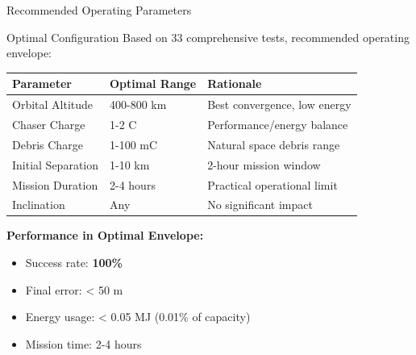 \documentclass[aspectratio=169]{beamer}
\begin{document}
\begin{frame}{Recommended Operating Parameters}
\begin{block}{Optimal Configuration}
Based on 33 comprehensive tests, recommended operating envelope:
\end{block}

\vspace{0.5em}
\begin{table}
\begin{tabular}{lll}
\toprule
\textbf{Parameter} & \textbf{Optimal Range} & \textbf{Rationale} \\
\midrule
Orbital Altitude & 400-800 km & Best convergence, low energy \\
Chaser Charge & 1-2 C & Performance/energy balance \\
Debris Charge & 1-100 mC & Natural space debris range \\
Initial Separation & 1-10 km & 2-hour mission window \\
Mission Duration & 2-4 hours & Practical operational limit \\
Inclination & Any & No significant impact \\
\bottomrule
\end{tabular}
\end{table}

\vspace{1em}
\textbf{Performance in Optimal Envelope:}
\begin{itemize}
    \item Success rate: \textbf{100\%}
    \item Final error: < 50 m
    \item Energy usage: < 0.05 MJ (0.01\% of capacity)
    \item Mission time: 2-4 hours
\end{itemize}
\end{frame}
\end{document}
